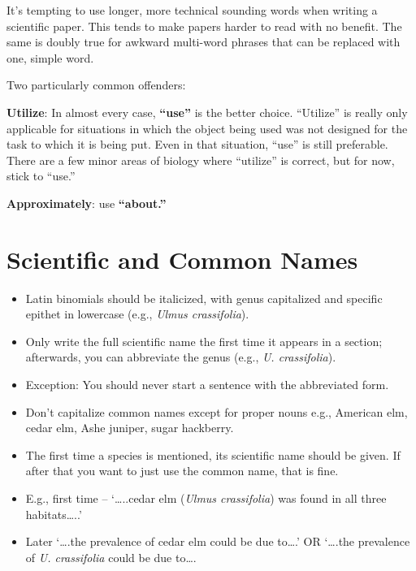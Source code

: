 \documentclass[]{book}
\providecommand{\tightlist}{%
  \setlength{\itemsep}{0pt}\setlength{\parskip}{0pt}}
\begin{document}
It's tempting to use longer, more technical sounding words when writing
a scientific paper. This tends to make papers harder to read with no
benefit. The same is doubly true for awkward multi-word phrases that can
be replaced with one, simple word.

Two particularly common offenders:

\textbf{Utilize}: In almost every case, \textbf{``use''} is the better
choice. ``Utilize'' is really only applicable for situations in which
the object being used was not designed for the task to which it is being
put. Even in that situation, ``use'' is still preferable. There are a
few minor areas of biology where ``utilize'' is correct, but for now,
stick to ``use.''

\textbf{Approximately}: use \textbf{``about.''}

\section{Scientific and Common Names}\label{scientific-and-common-names}

\begin{itemize}
\tightlist
\item
  Latin binomials should be italicized, with genus capitalized and
  specific epithet in lowercase (e.g., \emph{Ulmus crassifolia}).\\
\item
  Only write the full scientific name the first time it appears in a
  section; afterwards, you can abbreviate the genus (e.g., \emph{U.
  crassifolia}).
\item
  Exception: You should never start a sentence with the abbreviated
  form.
\item
  Don't capitalize common names except for proper nouns e.g., American
  elm, cedar elm, Ashe juniper, sugar hackberry.\\
\item
  The first time a species is mentioned, its scientific name should be
  given. If after that you want to just use the common name, that is
  fine.\\
\item
  E.g., first time -- `\ldots{}..cedar elm (\emph{Ulmus crassifolia})
  was found in all three habitats\ldots{}..'
\item
  Later `\ldots{}.the prevalence of cedar elm could be due to\ldots{}.'
  OR `\ldots{}.the prevalence of \emph{U. crassifolia} could be due
  to\ldots{}.
\end{itemize}
\end{document}
